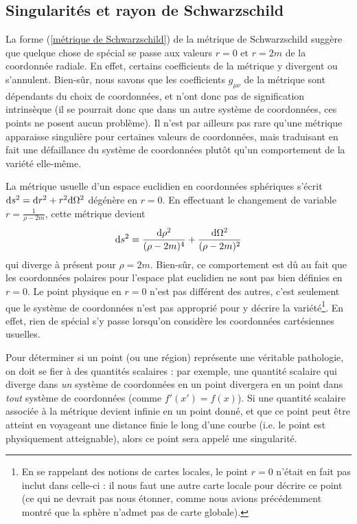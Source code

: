 \subsection{Singularités et rayon de Schwarzschild}
La forme (\ref{métrique de Schwarzschild}) de la métrique de Schwarzschild suggère que quelque chose de spécial se passe aux valeurs $r = 0$ et $r = 2m$ de la coordonnée radiale. En effet, certains coefficients de la métrique y divergent ou s'annulent. Bien-sûr, nous savons que les coefficients $g_{\mu\nu}$ de la métrique sont dépendants du choix de coordonnées, et n'ont donc pas de signification intrinsèque (il se pourrait donc que dans un autre système de coordonnées, ces points ne posent aucun problème). Il n'est par ailleurs pas rare qu'une métrique apparaisse singulière pour certaines valeurs de coordonnées, mais traduisant en fait une défaillance du système de coordonnées plutôt qu'un comportement de la variété elle-même. 
\begin{exmp}
    La métrique usuelle d'un espace euclidien en coordonnées sphériques s'écrit $\mathrm{d} s^2 = \mathrm{d} r^2 + r^2 \mathrm{d} \Omega^2$ dégénère en $r=0$. En effectuant le changement de variable $r = \frac{1}{\rho - 2m}$, cette métrique devient
    \begin{equation}
        \mathrm{d} s^2 = \frac{\mathrm{d} \rho^2}{(\rho - 2m)^4} + \frac{\mathrm{d} \Omega^2}{(\rho -2m)^2}
    \end{equation}
    qui diverge à présent pour $\rho=2m$. Bien-sûr, ce comportement est dû au fait que les coordonnées polaires pour l'espace plat euclidien ne sont pas bien définies en $r=0$. Le point physique en $r=0$ n'est pas différent des autres, c'est seulement que le système de coordonnées n'est pas approprié pour y décrire la variété\footnote{En se rappelant des notions de cartes locales, le point $r=0$ n'était en fait pas inclut dans celle-ci : il nous faut une autre carte locale pour décrire ce point (ce qui ne devrait pas nous étonner, comme nous avions précédemment montré que la sphère n'admet pas de carte globale).}. En effet, rien de spécial s'y passe lorsqu'on considère les coordonnées cartésiennes usuelles. 
\end{exmp}
Pour déterminer si un point (ou une région) représente une véritable pathologie, on doit se fier à des quantités scalaires : par exemple, une quantité scalaire qui diverge dans \emph{un} système de coordonnées en un point divergera en un point dans \emph{tout} système de coordonnées (comme $f'(x') = f(x)$). Si une quantité scalaire associée à la métrique devient infinie en un point donné, et que ce point peut être atteint en voyageant une distance finie le long d'une courbe (i.e. le point est physiquement atteignable), alors ce point sera appelé une singularité.

